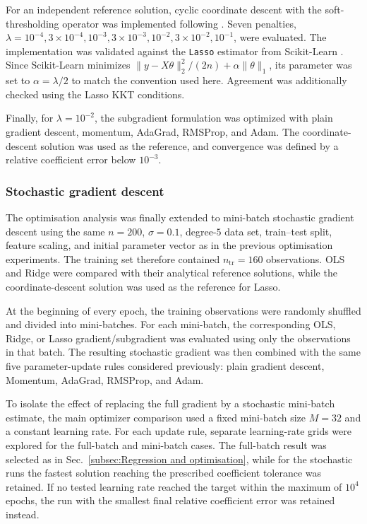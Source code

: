 \documentclass[aps,rmp,reprint,amsmath,amssymb,graphicx,longbibliography]{revtex4-1}
\begin{document}
For an independent reference solution, cyclic coordinate descent with the
soft-thresholding operator was implemented following \cite{HjorthJensen2026MLPS}. Seven penalties, $\lambda=10^{-4},3\times10^{-4},10^{-3},3\times10^{-3},
10^{-2},3\times10^{-2},10^{-1}$, were evaluated. The implementation was
validated against the \texttt{Lasso} estimator from Scikit-Learn
\cite{ScikitLearn2026}. Since Scikit-Learn minimizes
$\|y-X\theta\|_2^2/(2n)+\alpha\|\theta\|_1$, its parameter was set to
$\alpha=\lambda/2$ to match the convention used here. Agreement was
additionally checked using the Lasso KKT conditions.

Finally, for $\lambda=10^{-2}$, the subgradient formulation was optimized
with plain gradient descent, momentum, AdaGrad, RMSProp, and Adam. The
coordinate-descent solution was used as the reference, and convergence was
defined by a relative coefficient error below $10^{-3}$.

\subsubsection*{Stochastic gradient descent}

The optimisation analysis was finally extended to mini-batch stochastic
gradient descent using the same $n=200$, $\sigma=0.1$, degree-$5$ data set,
train--test split, feature scaling, and initial parameter vector as in the
previous optimisation experiments. The training set therefore contained
$n_{\mathrm{tr}}=160$ observations. OLS and Ridge were compared with their
analytical reference solutions, while the coordinate-descent solution was
used as the reference for Lasso.

At the beginning of every epoch, the training observations were randomly
shuffled and divided into mini-batches. For each mini-batch, the corresponding
OLS, Ridge, or Lasso gradient/subgradient was evaluated using only the
observations in that batch. The resulting stochastic gradient was then
combined with the same five parameter-update rules considered previously:
plain gradient descent, Momentum, AdaGrad, RMSProp, and Adam.

To isolate the effect of replacing the full gradient by a stochastic
mini-batch estimate, the main optimizer comparison used a fixed mini-batch
size $M=32$ and a constant learning rate. For each update rule, separate
learning-rate grids were explored for the full-batch and mini-batch cases.
The full-batch result was selected as in Sec.~\ref{subsec:Regression and optimisation}, while for the stochastic
runs the fastest solution reaching the prescribed coefficient tolerance was
retained. If no tested learning rate reached the target within the maximum
of $10^4$ epochs, the run with the smallest final relative coefficient error
was retained instead.
\end{document}
